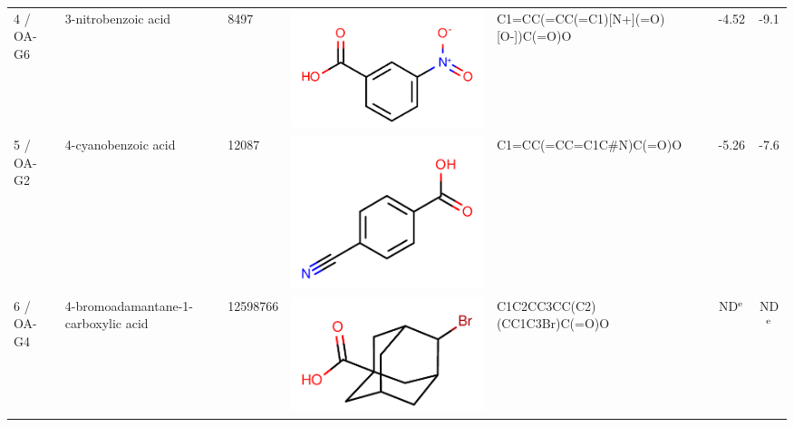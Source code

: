 \documentclass[aps,pre,twocolumn,nofootinbib,superscriptaddress,10pt, final,tightenlines]{revtex4-1}
\begin{document}
\begin{table}
\begin{tabular}{lllp{1.5cm}>{\ttfamily}lS[table-format=-1.3, table-figures-uncertainty=1]S[table-format=-1.2, table-figures-uncertainty=1]}
4 / OA-G6    & 3-nitrobenzoic acid                 & 8497             & \parbox[c]{1em}{\includegraphics[scale=0.15]{figures/8497.pdf}}     & C1=CC(=CC(=C1)[N+](=O)[O-])C(=O)O  & -4.52      & -9.1        \\
5 / OA-G2    & 4-cyanobenzoic acid                 & 12087            & \parbox[c]{1em}{\includegraphics[scale=0.15]{figures/12087.pdf}}    & C1=CC(=CC=C1C\#N)C(=O)O            & -5.26      & -7.6        \\
6 / OA-G4    & 4-bromoadamantane-1-carboxylic acid & 12598766         & \parbox[c]{1em}{\includegraphics[scale=0.15]{figures/12598766.pdf}} & C1C2CC3CC(C2)(CC1C3Br)C(=O)O       & {ND$^{\rm e}$}       & {ND$^{\rm e}$}      \\  

\end{tabular}
\end{table}
\end{document}
